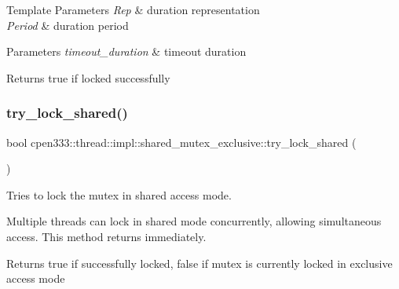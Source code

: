 \begin{DoxyTemplParams}{Template Parameters}
{\em Rep} & duration representation \\
\hline
{\em Period} & duration period \\
\hline
\end{DoxyTemplParams}

\begin{DoxyParams}{Parameters}
{\em timeout\+\_\+duration} & timeout duration \\
\hline
\end{DoxyParams}
\begin{DoxyReturn}{Returns}
true if locked successfully 
\end{DoxyReturn}
\mbox{\label{classcpen333_1_1thread_1_1impl_1_1shared__mutex__exclusive_ae1ca68cd6c5b0f5b14dde5ef52fe126a}} 
\subsubsection{\texorpdfstring{try\+\_\+lock\+\_\+shared()}{try\_lock\_shared()}}
{\footnotesize\ttfamily bool cpen333\+::thread\+::impl\+::shared\+\_\+mutex\+\_\+exclusive\+::try\+\_\+lock\+\_\+shared (\begin{DoxyParamCaption}{ }\end{DoxyParamCaption})\hspace{0.3cm}{\ttfamily [inline]}}



Tries to lock the mutex in shared access mode. 

Multiple threads can lock in shared mode concurrently, allowing simultaneous access. This method returns immediately.

\begin{DoxyReturn}{Returns}
true if successfully locked, false if mutex is currently locked in exclusive access mode 
\end{DoxyReturn}
\mbox{\label{classcpen333_1_1thread_1_1impl_1_1shared__mutex__exclusive_a2bae38f1f1d94c6f632db97a58f4cd6f}} 

